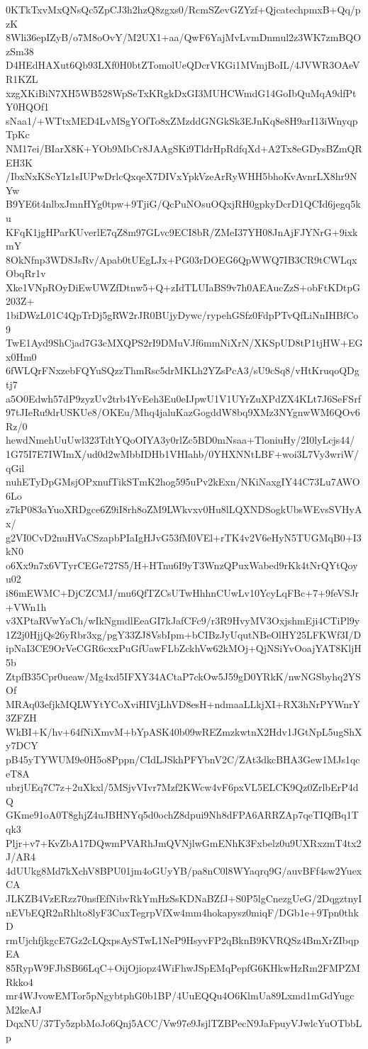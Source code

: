 0KTkTxvMxQNsQc5ZpCJ3h2hzQ8zgxs0/RcmSZevGZYzf+QjcatechpmxB+Qq/pzK
8Wli36epIZyB/o7M8oOvY/M2UX1+aa/QwF6YajMvLvmDnmul2z3WK7zmBQOzSm38
D4HEdHAXut6Qb93LXf0H0btZTomolUeQDcrVKGi1MVmjBoIL/4JVWR3OAeVR1KZL
xzgXKiBiN7XH5WB528WpSeTxKRgkDxGI3MUHCWmdG14GoIbQuMqA9dfPtY0HQOf1
sNaa1/+WTtxMED4LvMSgYOfTo8xZMzddGNGkSk3EJnKq8e8H9arI13iWnyqpTpKc
NM17ei/BIarX8K+YOb9MbCr8JAAgSKi9TldrHpRdfqXd+A2Tx8eGDysBZmQREH3K
/IbxNxKScYIz1sIUPwDrlcQxqeX7DIVxYpkVzeArRyWHH5bhoKvAvnrLX8hr9NYw
B9YE6t4nlbxJmnHYg0tpw+9TjiG/QcPuNOsuOQxjRH0gpkyDcrD1QCId6jegq5ku
KFqK1jgHParKUverlE7qZ8m97GLvc9ECI8bR/ZMeI37YH08JnAjFJYNrG+9ixkmY
8OkNfnp3WD8JsRv/Apab0tUEgLJx+PG03rDOEG6QpWWQ7IB3CR9tCWLqxObqRr1v
Xke1VNpROyDiEwUWZfDtnw5+Q+zIdTLUIaBS9v7h0AEAucZzS+obFtKDtpG203Z+
1biDWzL01C4QpTrDj5gRW2rJR0BUjyDywc/rypehGSfz0FdpPTvQfLiNnIHBfCo9
TwE1Ayd9ShCjad7G3cMXQPS2rI9DMuVJf6mmNiXrN/XKSpUD8tP1tjHW+EGx0Hm0
6fWLQrFNxzebFQYuSQzzThmRsc5drMKLh2YZsPcA3/sU9cSq8/vHtKruqoQDgtj7
a5O0Edwh57dP9zyzUv2trb4YvEeh3Eu0eIJpwU1V1UYrZuXPdZX4KLt7J6SeFSrf
97tJIeRu9drUSKUe8/OKEu/Mhq4jaluKazGogddW8bq9XMz3NYgnwWM6QOv6Rz/0
hewdNmehUuUwl323TdtYQoOIYA3y0rlZc5BD0mNsaa+TloniuHy/2I0lyLcjs44/
1G75I7E7IWImX/ud0d2wMbbIDHb1VHIahb/0YHXNNtLBF+woi3L7Vy3wriW/qGil
nuhETyDpGMsjOPxnufTikSTmK2hog595uPv2kExn/NKiNaxgIY44C73Lu7AWO6Lo
z7kP083aYuoXRDgce6Z9iI8rh8oZM9LWkvxv0Hu8lLQXNDSogkUbsWEvsSVHyAx/
g2VI0CvD2nuHVaCSzapbPIaIgHJvG53fM0VEl+rTK4v2V6eHyN5TUGMqB0+I3kN0
o6Xx9n7x6VTyrCEGe727S5/H+HTnu6I9yT3WnzQPuxWabed9rKk4tNrQYtQoyu02
i86mEWMC+DjCZCMJ/mu6QfTZCsUTwHhhnCUwLv10YcyLqFBc+7+9feVSJr+VWn1h
v3XPtaRVwYaCh/wIkNgmdlEeaGI7kJafCFc9/r3R9HvyMV3OxjshmEji4CTiPl9y
1Z2j0HjjQs26yRbr3xg/pgY33ZJ8VsbIpm+bCIBzJyUqutNBeOlHY25LFKWf3I/D
ipNaI3CE9OrVeCGR6cxxPuGfUawFLbZckhVw62kMOj+QjNSiYvOoajYAT8KljH5b
ZtpfB35Cpr0ueaw/Mg4xd5IFXY34ACtaP7ckOw5J59gD0YRkK/nwNGSbyhq2YSOf
MRAq03efjkMQLWYtYCoXviHIVjLhVD8esH+ndmaaLLkjXI+RX3hNrPYWnrY3ZFZH
WkBI+K/hv+64fNiXmvM+bYpASK40b09wREZmzkwtnX2Hdv1JGtNpL5ugShXy7DCY
pB45yTYWUM9e0H5o8Pppn/CIdLJSkhPFYbnV2C/ZAt3dkcBHA3Gew1MJs1qceT8A
ubrjUEq7C7z+2uXkxl/5MSjvVIvr7Mzf2KWcw4vF6pxVL5ELCK9Qz0ZrlbErP4dQ
GKme91oA0T8ghjZ4uJBHNYq5d0ochZ8dpui9Nh8dFPA6ARRZAp7qeTIQfBq1Tqk3
Pljr+v7+KvZbA17DQwmPVARhJmQVNjlwGmENhK3Fxbelz0u9UXRxzmT4tx2J/AR4
4dUUkg8Md7kXchV8BPU01jm4oGUyYB/pa8nC0l8WYaqrq9G/auvBFf4sw2YuexCA
JLKZB4VzERzz70nsfEfNibvRkYmHzSsKDNaBZfJ+S0P5lgCnezgUeG/2DqgztnyI
nEVbEQR2nRhlto8lyF3CuxTegrpVfXw4mm4hokapysz0miqF/DGb1e+9Tpn0thkD
rmUjchfjkgcE7Gz2cLQxpsAySTwL1NeP9HsyvFP2qBknB9KVRQSz4BmXrZIbqpEA
85RypW9FJbSB66LqC+OijOjiopz4WiFhwJSpEMqPepfG6KHkwHzRm2FMPZMRkko4
mr4WJvowEMTor5pNgybtphG0b1BP/4UuEQQu4O6KlmUa89Lxmd1mGdYugcM2keAJ
DqxNU/37Ty5zpbMoJo6Qnj5ACC/Vw97e9JsjlTZBPecN9JaFpuyVJwlcYuOTbbLp
